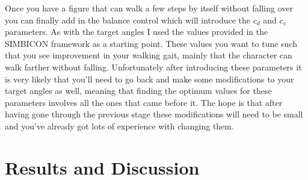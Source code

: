 \documentclass[12pt, a4paper]{article}
\begin{document}
Once you have a figure that can walk a few steps by itself without falling over you can finally add in the balance control which will introduce the $c_d$ and $c_v$ parameters. As with the target angles I used the values provided in the SIMBICON framework as a starting point. These values you want to tune such that you see improvement in your walking gait, mainly that the character can walk farther without falling. Unfortunately after introducing these parameters it is very likely that you'll need to go back and make some modifications to your target angles as well, meaning that finding the optimum values for these parameters involves all the ones that came before it. The hope is that after having gone through the previous stage these modifications will need to be small and you've already got lots of experience with changing them.   

\newpage
\section{Results and Discussion}
\end{document}
